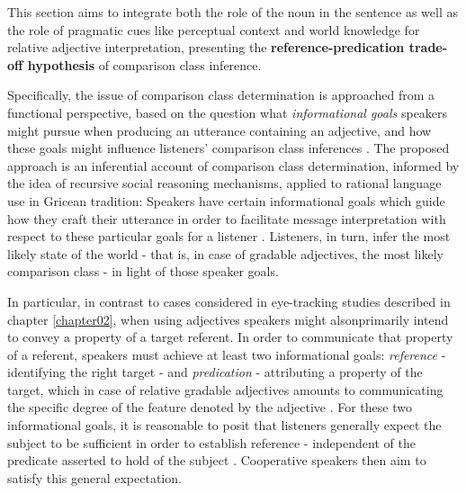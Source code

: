 This section aims to integrate both the role of the noun in the sentence as well as the role of pragmatic cues like perceptual context and world knowledge for relative adjective interpretation, presenting the \textbf{reference-predication trade-off hypothesis} of comparison class inference. 

Specifically, the issue of comparison class determination is approached from a functional perspective, based on the question what \emph{informational goals} speakers might pursue when producing an utterance containing an adjective, and how these goals might influence listeners’ comparison class inferences \parencite{tessler2020}.
The proposed approach is an inferential account of comparison class determination, informed by the idea of recursive social reasoning mechanisms, applied to rational language use in Gricean tradition: Speakers have certain informational goals which guide how they craft their utterance in order to facilitate message interpretation with respect to these particular goals for a listener \parencite{goodman2016}. Listeners, in turn, infer the most likely state of the world - that is, in case of gradable adjectives, the most likely comparison class - in light of those speaker goals. 

In particular, in contrast to cases considered in eye-tracking studies described in chapter \ref{chapter02},  when using adjectives speakers might alsonprimarily intend to convey a property of a target referent. In order to communicate that property of a referent, speakers must achieve at least two informational goals: \textit{reference} - identifying the right target - and \textit{predication} - attributing a property of the target, which in case of relative gradable adjectives amounts to communicating the specific degree of the feature denoted by the adjective \parencite{Reboul2001, Kennedy2007}.  
For these two informational goals, it is reasonable to posit that listeners generally expect the subject to be sufficient in order to establish reference - independent of the predicate asserted to hold of the subject \parencite{Reboul2001, syrett2010meaning, searle1969speech}. Cooperative speakers then aim to satisfy this general expectation.

